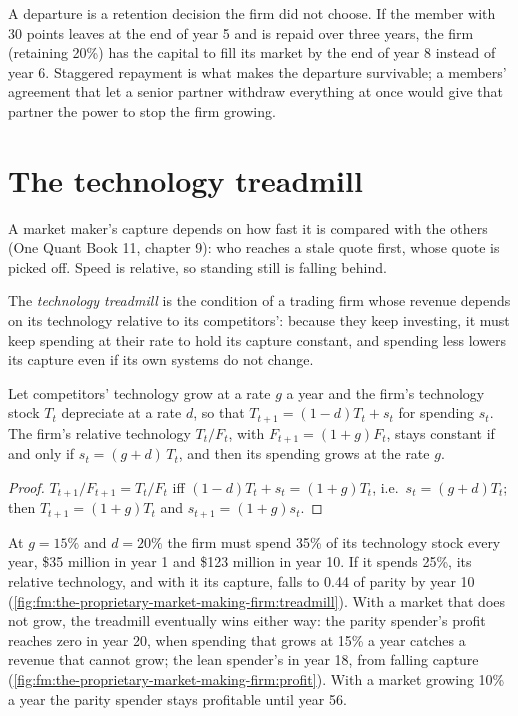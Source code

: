 A departure is a retention decision the firm did not choose. If the member with 30 points leaves at the end of year 5 and is repaid over three
years, the firm (retaining 20\%) has the capital to fill its market by the end of year 8 instead of year 6. Staggered repayment is what makes the departure survivable; a
members' agreement that let a senior partner withdraw everything at once would give that partner the power to stop the firm growing.

\section{The technology treadmill}

A market maker's capture depends on how fast it is compared with the others (One Quant Book 11, chapter 9): who reaches a stale quote first,
whose quote is picked off. Speed is relative, so standing still is falling behind.

\begin{definition}\label{def:fm:the-proprietary-market-making-firm:treadmill}
The \emph{technology treadmill} is the condition of a trading firm whose revenue depends on its technology relative to
its competitors': because they keep investing, it must keep spending at their rate to hold its capture constant, and spending less lowers its
capture even if its own systems do not change.
\end{definition}

\begin{proposition}\label{prop:fm:the-proprietary-market-making-firm:parity}
Let competitors' technology grow at a rate $g$ a year and the firm's technology stock $T_t$ depreciate at a rate $d$, so that
$T_{t+1}=(1-d)T_t+s_t$ for spending $s_t$. The firm's relative technology $T_t/F_t$, with $F_{t+1}=(1+g)F_t$, stays constant if and only if
$s_t=(g+d)\,T_t$, and then its spending grows at the rate $g$.
\end{proposition}

\begin{proof}
$T_{t+1}/F_{t+1}=T_t/F_t$ iff $(1-d)T_t+s_t=(1+g)T_t$, i.e.\ $s_t=(g+d)T_t$; then $T_{t+1}=(1+g)T_t$ and $s_{t+1}=(1+g)s_t$.
\end{proof}

At $g=15\%$ and $d=20\%$ the firm must spend 35\% of its technology stock every year, \$35 million in year 1 and \$123 million in year 10. If it
spends 25\%, its relative technology, and with it its capture, falls to 0.44 of parity by year 10
(\cref{fig:fm:the-proprietary-market-making-firm:treadmill}). With a market that does not grow, the treadmill eventually wins either way: the
parity spender's profit reaches zero in year 20, when spending that grows at 15\% a year catches a revenue that cannot grow; the lean spender's in
year 18, from falling capture (\cref{fig:fm:the-proprietary-market-making-firm:profit}). With a market growing 10\% a year the parity spender stays
profitable until year 56.

